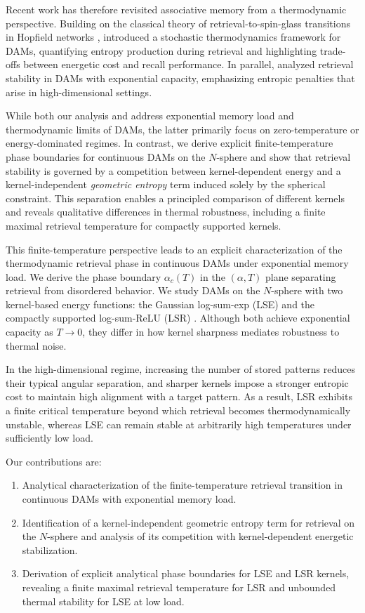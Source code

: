 \documentclass{article}
\theoremstyle{plain}
\theoremstyle{definition}
\theoremstyle{remark}
\begin{document}
Recent work has therefore revisited associative memory from a thermodynamic perspective. Building on the classical theory of retrieval-to-spin-glass transitions in Hopfield networks \citep{amit1987statistical}, \citet{rooke2026stochastic} introduced a stochastic thermodynamics framework for DAMs, quantifying entropy production during retrieval and highlighting trade-offs between energetic cost and recall performance. In parallel, \citet{lucibello2024exponential} analyzed retrieval stability in DAMs with exponential capacity, emphasizing entropic penalties that arise in high-dimensional settings.

While both our analysis and \citet{lucibello2024exponential} address exponential memory load and thermodynamic limits of DAMs, the latter primarily focus on zero-temperature or energy-dominated regimes. In contrast, we derive explicit finite-temperature phase boundaries for continuous DAMs on the $N$-sphere and show that retrieval stability is governed by a competition between kernel-dependent energy and a kernel-independent \emph{geometric entropy} term induced solely by the spherical constraint. This separation enables a principled comparison of different kernels and reveals qualitative differences in thermal robustness, including a finite maximal retrieval temperature for compactly supported kernels.

This finite-temperature perspective leads to an explicit characterization of the thermodynamic retrieval phase in continuous DAMs under exponential memory load. We derive the phase boundary $\alpha_c(T)$ in the $(\alpha,T)$ plane separating retrieval from disordered behavior. We study DAMs on the $N$-sphere with two kernel-based energy functions: the Gaussian log-sum-exp (LSE) and the compactly supported log-sum-ReLU (LSR) \citep{hoover2025dense}. Although both achieve exponential capacity as $T \to 0$, they differ in how kernel sharpness mediates robustness to thermal noise.

In the high-dimensional regime, increasing the number of stored patterns reduces their typical angular separation, and sharper kernels impose a stronger entropic cost to maintain high alignment with a target pattern. As a result, LSR exhibits a finite critical temperature beyond which retrieval becomes thermodynamically unstable, whereas LSE can remain stable at arbitrarily high temperatures under sufficiently low load.

Our contributions are:
\begin{enumerate}
    \item Analytical characterization of the finite-temperature retrieval transition in continuous DAMs with exponential memory load.
    \item Identification of a kernel-independent geometric entropy term for retrieval on the $N$-sphere and analysis of its competition with kernel-dependent energetic stabilization.
    \item Derivation of explicit analytical phase boundaries for LSE and LSR kernels, revealing a finite maximal retrieval temperature for LSR and unbounded thermal stability for LSE at low load.
\end{enumerate}
\end{document}
